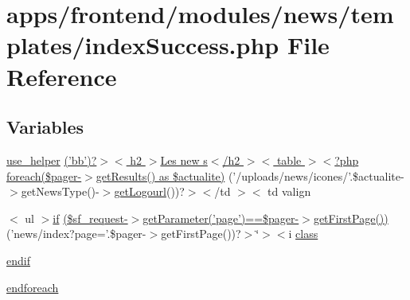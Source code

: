 \hypertarget{frontend_2modules_2news_2templates_2index_success_8php}{\section{apps/frontend/modules/news/templates/index\-Success.php File Reference}
\label{frontend_2modules_2news_2templates_2index_success_8php}
}
\subsection*{Variables}
\begin{DoxyCompactItemize}
\item 
\hyperlink{presse_2modules_2page_2templates_2view_success_8php_ad20740d877696f45a78b0497ff807965}{use\-\_\-helper} \hyperlink{frontend_2modules_2news_2templates_2index_success_8php_a8b9d9b2d541ff9d103757ff53e14a228}{('bb')?$>$$<$ h2 $>$\-Les new s$<$/h2 $>$$<$ table $>$$<$?php foreach(\$pager-\/$>$get\-Results() as \$actualite)} ('/uploads/news/icones/'.\$actualite-\/$>$get\-News\-Type()-\/$>$\hyperlink{backend_2modules_2tournament_2templates_2index_success_8php_a35941bec2f3cf7beef9b8010a1342325}{get\-Logourl}())?$>$$<$/td $>$$<$ td valign
\item 
$<$ ul $>$\hyperlink{live_2modules_2tournament_2templates_2__form_team_8php_ae30a307b320d8da5d9a945eaf68f7549}{if} \hyperlink{frontend_2modules_2news_2templates_2index_success_8php_aaed49dff7a3909bacca6a7e3768ef0a7}{(\$sf\-\_\-request-\/$>$get\-Parameter('page')==\$pager-\/$>$get\-First\-Page())} ('news/index?page='.\$pager-\/$>$get\-First\-Page())?$>$\char`\"{}$>$$<$i \hyperlink{live_2modules_2news_2templates_2__actualitelight_8php_a185c73c6507391d1eb38c776b68ce96d}{class}
\item 
\hyperlink{frontend_2modules_2news_2templates_2index_success_8php_a82cd33ca97ff99f2fcc5e9c81d65251b}{endif}
\item 
\hyperlink{frontend_2modules_2news_2templates_2index_success_8php_a672d9707ef91db026c210f98cc601123}{endforeach}
\end{DoxyCompactItemize}


